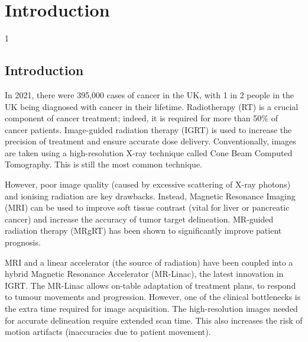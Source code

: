 \doublespacing %

\chapter{Introduction}
\label{ch1}

\begin{spacing}{1} %
\minitoc %
\end{spacing} %
\thesisspacing %


\section{Introduction}

In 2021, there were 395,000 cases of cancer in the UK, with 1 in 2 people in the UK being diagnosed with cancer in their lifetime. \cite{world_cancer_research_fund} Radiotherapy (RT) is a crucial component of cancer treatment; indeed, it is required for more than 50\% of cancer patients. \cite{rt_cancer_prevalance:15} Image-guided radiation therapy (IGRT) is used to increase the precision of treatment and ensure accurate dose delivery. Conventionally, images are taken using a high-resolution X-ray technique called Cone Beam Computed Tomography. This is still the most common technique. \cite{liu_clinical_app_mrlinac:2023} 

However, poor image quality (caused by excessive scattering of X-ray photons) and ionising radiation are key drawbacks. Instead, Magnetic Resonance Imaging (MRI) can be used to improve soft tissue contrast (vital for liver or pancreatic cancer) and increase the accuracy of tumor target delineation. MR-guided radiation therapy (MRgRT) has been shown to significantly improve patient prognosis. \cite{liu_clinical_app_mrlinac:2023}

MRI and a linear accelerator (the source of radiation) have been coupled into a hybrid Magnetic Resonance Accelerator (MR-Linac), the latest innovation in IGRT. The MR-Linac allows on-table adaptation of treatment plans, to respond to tumour movements and progression. However, one of the clinical bottlenecks is the extra time required for image acquisition. \cite{mrlinac_in_practice:23} The high-resolution images needed for accurate delineation require extended scan time. This also increases the risk of motion artifacts (inaccuracies due to patient movement).

